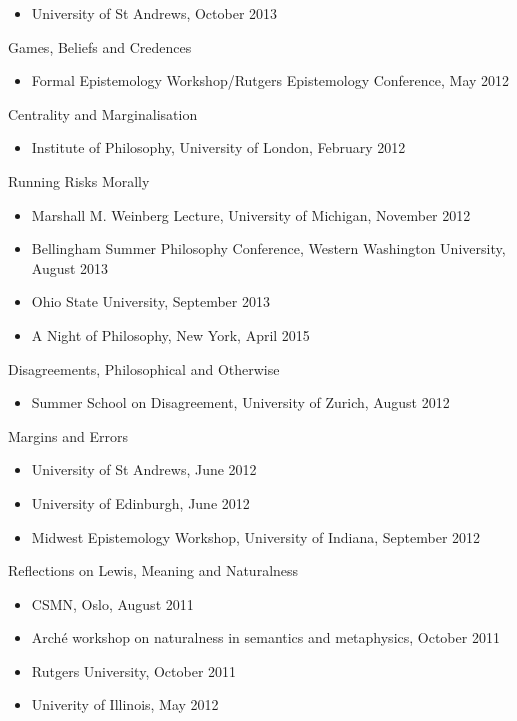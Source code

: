 \documentclass[
  10pt,
  letterpaper,
  DIV=11,
  numbers=noendperiod,
  twoside]{scrartcl}
\providecommand{\tightlist}{%
  \setlength{\itemsep}{0pt}\setlength{\parskip}{0pt}}\usepackage{longtable,booktabs,array}
\begin{document}
\begin{itemize}
\tightlist
\item
  University of St Andrews, October 2013
\end{itemize}

Games, Beliefs and Credences

\begin{itemize}
\tightlist
\item
  Formal Epistemology Workshop/Rutgers Epistemology Conference, May 2012
\end{itemize}

Centrality and Marginalisation

\begin{itemize}
\tightlist
\item
  Institute of Philosophy, University of London, February 2012
\end{itemize}

Running Risks Morally

\begin{itemize}
\tightlist
\item
  Marshall M. Weinberg Lecture, University of Michigan, November 2012
\item
  Bellingham Summer Philosophy Conference, Western Washington
  University, August 2013
\item
  Ohio State University, September 2013
\item
  A Night of Philosophy, New York, April 2015
\end{itemize}

Disagreements, Philosophical and Otherwise

\begin{itemize}
\tightlist
\item
  Summer School on Disagreement, University of Zurich, August 2012
\end{itemize}

Margins and Errors

\begin{itemize}
\tightlist
\item
  University of St Andrews, June 2012
\item
  University of Edinburgh, June 2012
\item
  Midwest Epistemology Workshop, University of Indiana, September 2012
\end{itemize}

Reflections on Lewis, Meaning and Naturalness

\begin{itemize}
\tightlist
\item
  CSMN, Oslo, August 2011
\item
  Arché workshop on naturalness in semantics and metaphysics, October
  2011
\item
  Rutgers University, October 2011
\item
  Univerity of Illinois, May 2012
\end{itemize}
\end{document}
